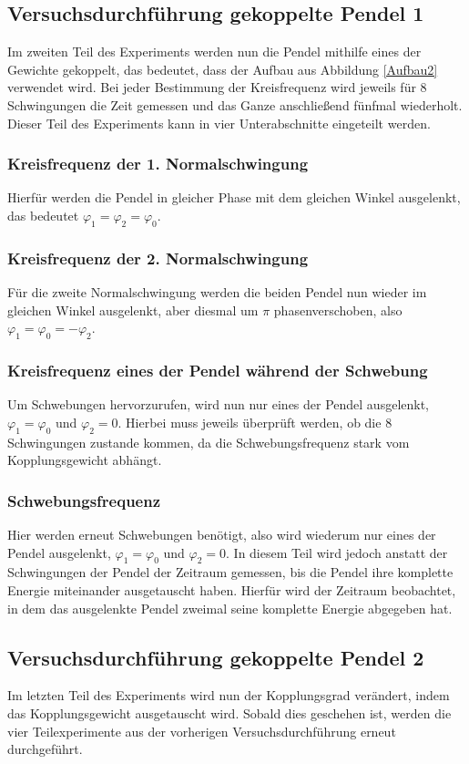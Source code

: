\subsection{Versuchsdurchführung gekoppelte Pendel 1}
Im zweiten Teil des Experiments werden nun die Pendel mithilfe eines der Gewichte gekoppelt, das bedeutet, dass der Aufbau aus Abbildung \ref{Aufbau2} verwendet wird. Bei jeder Bestimmung der Kreisfrequenz wird jeweils für 8 Schwingungen die Zeit gemessen und das Ganze anschließend fünfmal wiederholt. Dieser Teil des Experiments kann in vier Unterabschnitte eingeteilt werden.

\subsubsection*{Kreisfrequenz der 1. Normalschwingung}
Hierfür werden die Pendel in gleicher Phase mit dem gleichen Winkel ausgelenkt, das bedeutet $\varphi_1 = \varphi_2 = \varphi_0$.

\subsubsection*{Kreisfrequenz der 2. Normalschwingung}
Für die zweite Normalschwingung werden die beiden Pendel nun wieder im gleichen Winkel ausgelenkt, aber diesmal um $\pi$ phasenverschoben, also $\varphi_1 = \varphi_0 = -\varphi_2$.

\subsubsection*{Kreisfrequenz eines der Pendel während der Schwebung}
Um Schwebungen hervorzurufen, wird nun nur eines der Pendel ausgelenkt, $\varphi_1 = \varphi_0$ und $\varphi_2 = 0$. Hierbei muss jeweils überprüft werden, ob die 8 Schwingungen zustande kommen, da die Schwebungsfrequenz stark vom Kopplungsgewicht abhängt.

\subsubsection*{Schwebungsfrequenz}
Hier werden erneut Schwebungen benötigt, also wird wiederum nur eines der Pendel ausgelenkt, $\varphi_1 = \varphi_0$ und $\varphi_2 = 0$. In diesem Teil wird jedoch anstatt der Schwingungen der Pendel der Zeitraum gemessen, bis die Pendel ihre komplette Energie miteinander ausgetauscht haben. Hierfür wird der Zeitraum beobachtet, in dem das ausgelenkte Pendel zweimal seine komplette Energie abgegeben hat.

\subsection{Versuchsdurchführung gekoppelte Pendel 2}
Im letzten Teil des Experiments wird nun der Kopplungsgrad verändert, indem das Kopplungsgewicht ausgetauscht wird. Sobald dies geschehen ist, werden die vier Teilexperimente aus der vorherigen Versuchsdurchführung erneut durchgeführt.
